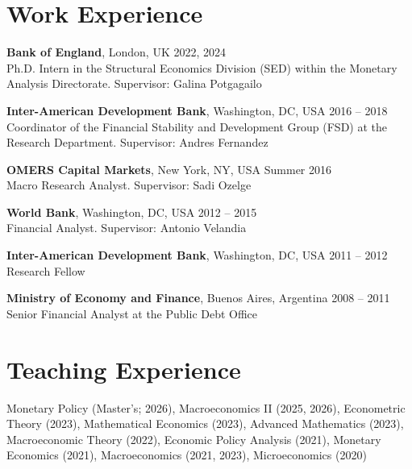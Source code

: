 \documentclass[11pt,letterpaper]{article}%
\begin{document}
\section*{Work Experience}
\vspace{-0.2cm}
\begin{list}{}{} 
\itemindent=-15pt
	\setlength\itemsep{-0.2cm}
\item \textbf{Bank of England}, London, UK \hfill 2022, 2024 \\ Ph.D. Intern in the Structural Economics Division (SED) within the Monetary Analysis Directorate. Supervisor: Galina Potgagailo \\
\item \textbf{Inter-American Development Bank}, Washington, DC, USA \hfill {2016 – 2018} \\ 
Coordinator of the Financial Stability and Development Group (FSD) at the Research Department. Supervisor: Andres Fernandez \\
\item \textbf{OMERS Capital Markets}, New York, NY, USA \hfill {Summer 2016} \\
Macro Research Analyst. Supervisor: Sadi Ozelge \\
\item \textbf{World Bank}, Washington, DC, USA \hfill {2012 – 2015} \\ 
Financial Analyst. Supervisor: Antonio Velandia \\
\item \textbf{Inter-American Development Bank}, Washington, DC, USA \hfill {2011 – 2012} \\ 
Research Fellow \\
\item \textbf{Ministry of Economy and Finance}, Buenos Aires, Argentina  \hfill {2008 – 2011} \\ 
Senior Financial Analyst at the Public Debt Office  
\end{list}


\section*{Teaching Experience}	
\vspace{-0.2cm}
Monetary Policy (Master's; 2026), Macroeconomics II (2025, 2026), Econometric Theory (2023), Mathematical Economics (2023), Advanced Mathematics (2023),  Macroeconomic Theory (2022), Economic Policy Analysis (2021), Monetary Economics (2021), Macroeconomics (2021, 2023), Microeconomics (2020)
\end{document}
